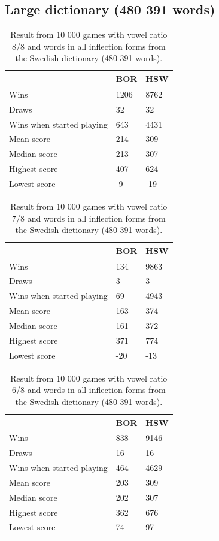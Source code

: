 \documentclass[a4paper, 12pt]{report}
\begin{document}
\subsection{Large dictionary (480 391 words)}
\begin{table}[h]
\centering
    \begin{tabular}{ l | l | l }
   	& BOR & HSW \\
   	\hline
   	Wins & 1206 & 8762 \\
	Draws & 32 & 32 \\
	Wins when started playing & 643 & 4431 \\   	
	Mean score & 214 & 309 \\
	Median score & 213 & 307 \\	 	 
	Highest score & 407 & 624 \\
	Lowest score & -9 & -19 \\		
    \end{tabular}
\caption{Result from 10 000 games with vowel ratio 8/8 and words in all inflection forms from the Swedish dictionary (480 391 words).}
\label{tab:borhswstats8}
\end{table}

\begin{table}[h]
\centering
    \begin{tabular}{ l | l | l }
   	& BOR & HSW \\
   	\hline
   	Wins & 134 & 9863 \\
	Draws & 3  & 3 \\
	Wins when started playing & 69 & 4943 \\   	
	Mean score & 163 & 374 \\
	Median score & 161 & 372 \\	 	 
	Highest score & 371 & 774 \\
	Lowest score & -20 & -13 \\		
    \end{tabular}
\caption{Result from 10 000 games with vowel ratio 7/8 and words in all inflection forms from the Swedish dictionary (480 391 words).}
\label{tab:borhswstats7}
\end{table}

\begin{table}[h]
\centering
    \begin{tabular}{ l | l | l }
   	& BOR & HSW \\
   	\hline
   	Wins & 838 & 9146 \\
	Draws & 16  & 16 \\
	Wins when started playing & 464 & 4629 \\   	
	Mean score & 203 & 309 \\
	Median score & 202 & 307 \\	 	 
	Highest score & 362 & 676\\
	Lowest score & 74 & 97 \\		
    \end{tabular}
\caption{Result from 10 000 games with vowel ratio 6/8 and words in all inflection forms from the Swedish dictionary (480 391 words).}
\label{tab:borhswstats6}
\end{table}
\end{document}
